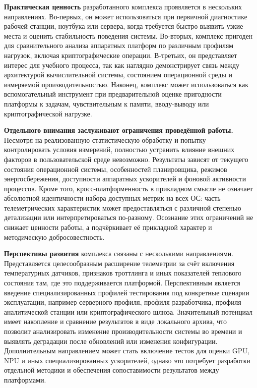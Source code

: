 \textbf{Практическая ценность} разработанного комплекса проявляется в нескольких направлениях. Во-первых, он может использоваться при первичной диагностике рабочей станции, ноутбука или сервера, когда требуется быстро выявить узкие места и оценить стабильность поведения системы. Во-вторых, комплекс пригоден для сравнительного анализа аппаратных платформ по различным профилям нагрузок, включая криптографические операции. В-третьих, он представляет интерес для учебного процесса, так как наглядно демонстрирует связь между архитектурой вычислительной системы, состоянием операционной среды и измеряемой производительностью. Наконец, комплекс может использоваться как вспомогательный инструмент при предварительной оценке пригодности платформы к задачам, чувствительным к памяти, вводу-выводу или криптографической нагрузке.

\textbf{Отдельного внимания заслуживают ограничения проведённой работы.} Несмотря на реализованную статистическую обработку и попытку контролировать условия измерений, полностью устранить влияние внешних факторов в пользовательской среде невозможно. Результаты зависят от текущего состояния операционной системы, особенностей планировщика, режимов энергосбережения, доступности аппаратных ускорителей и фоновой активности процессов. Кроме того, кросс-платформенность в прикладном смысле не означает абсолютной идентичности набора доступных метрик на всех ОС: часть телеметрических характеристик может предоставляться с различной степенью детализации или интерпретироваться по-разному. Осознание этих ограничений не снижает ценности работы, а подчёркивает её прикладной характер и методическую добросовестность.

\textbf{Перспективы развития} комплекса связаны с несколькими направлениями. Представляется целесообразным расширение телеметрии за счёт включения температурных датчиков, признаков троттлинга и иных показателей теплового состояния там, где это поддерживается платформой. Перспективным является введение специализированных профилей тестирования под конкретные сценарии эксплуатации, например серверного профиля, профиля разработчика, профиля аналитической станции или криптографического шлюза. Значительный потенциал имеет накопление и сравнение результатов в виде локального архива, что позволит анализировать изменение производительности системы во времени и выявлять деградации после обновлений или изменения конфигурации. Дополнительным направлением может стать включение тестов для оценки GPU, NPU и иных специализированных ускорителей, однако это потребует разработки отдельной методики и обеспечения сопоставимости результатов между платформами.

